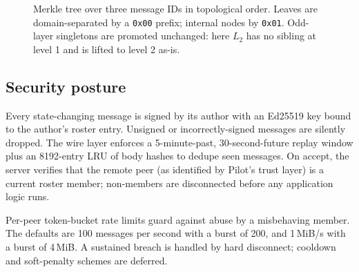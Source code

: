 \documentclass[11pt,a4paper,twocolumn]{article}
\begin{document}
\begin{figure}[t]
\centering
{}
\caption{Merkle tree over three message IDs in topological order. Leaves
are domain-separated by a \texttt{0x00} prefix; internal nodes by
\texttt{0x01}. Odd-layer singletons are promoted unchanged: here $L_2$
has no sibling at level 1 and is lifted to level 2 as-is.}
\label{fig:merkle}
\end{figure}

\subsection{Security posture}
\label{sec:security}

Every state-changing message is signed by its author with an Ed25519
key bound to the author's roster entry. Unsigned or incorrectly-signed
messages are silently dropped. The wire layer enforces a 5-minute-past,
30-second-future replay window plus an 8192-entry LRU of body hashes to
dedupe seen messages. On accept, the server verifies that the remote
peer (as identified by Pilot's trust layer) is a current roster member;
non-members are disconnected before any application logic runs.

Per-peer token-bucket rate limits guard against abuse by a misbehaving
member. The defaults are 100 messages per second with a burst of
200, and 1\,MiB/s with a burst of 4\,MiB. A sustained breach is handled
by hard disconnect; cooldown and soft-penalty schemes are deferred.
\end{document}
